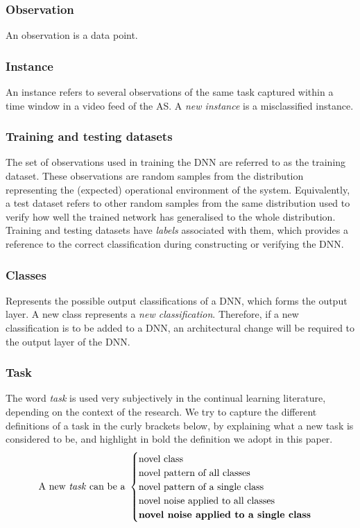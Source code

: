\subsubsection{Observation}
An observation is a data point. 

\subsubsection{Instance}
An instance refers to several observations of the same task captured within a time window in a video feed of the AS.
%
A \textit{new instance} is a misclassified instance.

\subsubsection{Training and testing datasets}
The set of observations used in training the DNN are referred to as the training dataset.
%
These observations are random samples from the distribution representing the (expected) operational environment of the system.
%
Equivalently, a test dataset refers to other random samples from the same distribution used to verify how well the trained network has generalised to the whole distribution.
%
Training and testing datasets have \textit{labels} associated with them, which provides a reference to the correct classification during constructing or verifying the DNN.

\subsubsection{Classes}
Represents the possible output classifications of a DNN, which forms the output layer.
%
A new class represents a \textit{new classification}. 
%
Therefore, if a new classification is to be added to a DNN, an architectural change will be required to the output layer of the DNN.

\subsubsection{Task}
The word \textit{task} is used very subjectively in the continual learning literature, depending on the context of the research. 
%
We try to capture the different definitions of a task in the curly brackets below, by explaining what a new task is considered to be, and highlight in bold the definition we adopt in this paper.
%
\begin{equation*}
  \text{A new \textit{task} can be a~} 
    \begin{cases}
     \text{novel class}\\
      \text{novel pattern of all classes}\\
      \text{novel pattern of a single class}\\
      \text{novel noise applied to all classes}\\
      \text{\textbf{novel noise applied to a single class}}
    \end{cases}       
\end{equation*}

